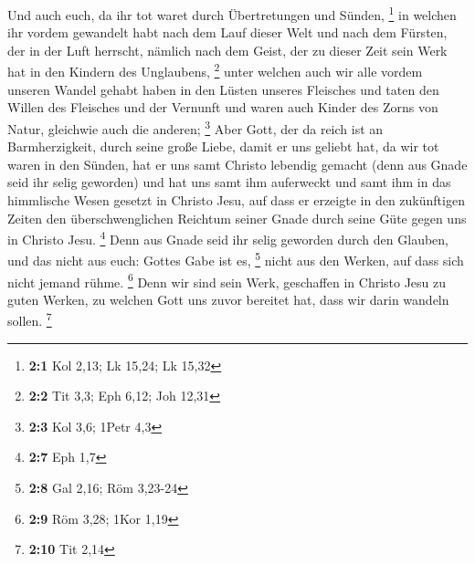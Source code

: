  Und auch euch, da ihr tot waret durch Übertretungen und
Sünden, \footnote{\textbf{2:1} Kol 2,13; Lk 15,24; Lk 15,32}
 in welchen ihr vordem gewandelt habt nach dem Lauf dieser
Welt und nach dem Fürsten, der in der Luft herrscht, nämlich nach dem
Geist, der zu dieser Zeit sein Werk hat in den Kindern des Unglaubens,
\footnote{\textbf{2:2} Tit 3,3; Eph 6,12; Joh 12,31}  unter
welchen auch wir alle vordem unseren Wandel gehabt haben in den Lüsten
unseres Fleisches und taten den Willen des Fleisches und der Vernunft
und waren auch Kinder des Zorns von Natur, gleichwie auch die anderen;
\footnote{\textbf{2:3} Kol 3,6; 1Petr 4,3}  Aber Gott, der
da reich ist an Barmherzigkeit, durch seine große Liebe, damit er uns
geliebt hat,  da wir tot waren in den Sünden, hat er uns
samt Christo lebendig gemacht (denn aus Gnade seid ihr selig geworden)
 und hat uns samt ihm auferweckt und samt ihm in das
himmlische Wesen gesetzt in Christo Jesu,  auf dass er
erzeigte in den zukünftigen Zeiten den überschwenglichen Reichtum seiner
Gnade durch seine Güte gegen uns in Christo Jesu. \footnote{\textbf{2:7}
  Eph 1,7}  Denn aus Gnade seid ihr selig geworden durch den
Glauben, und das nicht aus euch: Gottes Gabe ist es, \footnote{\textbf{2:8}
  Gal 2,16; Röm 3,23-24}  nicht aus den Werken, auf dass
sich nicht jemand rühme. \footnote{\textbf{2:9} Röm 3,28; 1Kor 1,19}
 Denn wir sind sein Werk, geschaffen in Christo Jesu zu
guten Werken, zu welchen Gott uns zuvor bereitet hat, dass wir darin
wandeln sollen. \footnote{\textbf{2:10} Tit 2,14}

